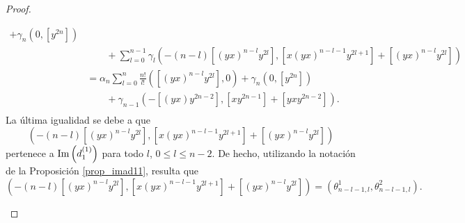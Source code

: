 \documentclass[fleqn,../tesis.tex]{subfiles}
\begin{document}
\begin{proof}
\begin{itemize}
\begin{align*}
                + \gamma_n\left(0, \left[y^{2n}\right]\right)\\
            &\qquad + \sum_{l = 0}^{n - 1}\gamma_l \left( -(n - l)\left[(yx)^{n - l}y^{2l}\right],
                    \left[x(yx)^{n - l - 1}y^{2l + 1}\right] + \left[(yx)^{n - l}y^{2l}\right] \right)\\
            &= \alpha_n \sum_{l = 0}^n\frac{n!}{l!}\left( \left[(yx)^{n - l}y^{2l} \right], 0 \right)
                + \gamma_n\left(0, \left[y^{2n}\right]\right)\\
            &\qquad + \gamma_{n - 1} \left( -\left[(yx)y^{2n - 2}\right],
                    \left[xy^{2n - 1}\right] + \left[yxy^{2n - 2}\right] \right).\\        
        \end{align*}
        La última igualidad se debe a que
            \[ 
                \left( -(n - l)\left[(yx)^{n - l}y^{2l}\right],
                    \left[x(yx)^{n - l - 1}y^{2l + 1}\right] + \left[(yx)^{n - l}y^{2l}\right] \right)
            \]
        pertenece a $\operatorname{Im}\left(d_{1}^{(1)}\right)$ para todo $l$, $0 \leq l \leq n-2$. De hecho, utilizando
        la notación de la Proposición \ref{prop_imad11}, resulta que
        \[ 
             \left( -(n - l)\left[(yx)^{n - l}y^{2l}\right],
                 \left[x(yx)^{n - l - 1}y^{2l + 1}\right] + \left[(yx)^{n - l}y^{2l}\right] \right)
                     = \left(\theta^{1}_{n - l - 1, l}, \theta^{2}_{n - l - 1, l}\right).
        \]
    

\end{itemize}
\end{proof}
\end{document}
